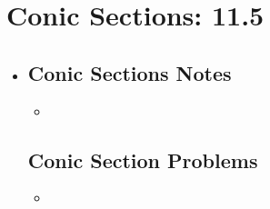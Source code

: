 \section{Conic Sections: 11.5}
\begin{itemize}
  \item[]

  \subsection{Conic Sections Notes}
  \begin{itemize}
    \item
  \end{itemize}

  \subsection{Conic Section Problems}
  \begin{itemize}
    \item
  \end{itemize}

\end{itemize}

